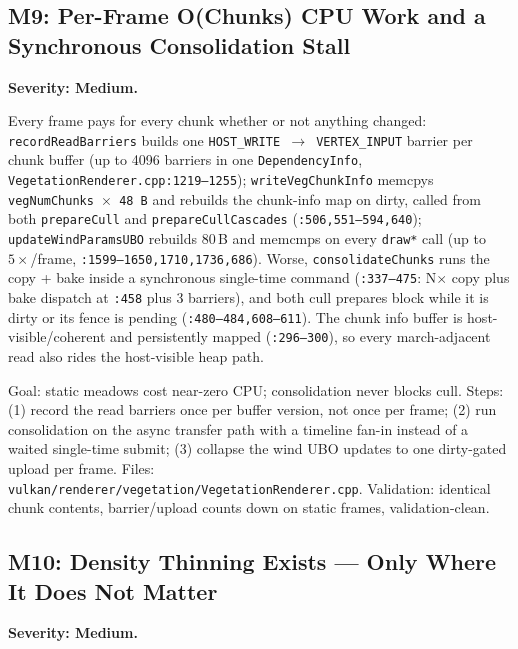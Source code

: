 \documentclass[11pt,a4paper]{article}
\begin{document}
\subsection{M9: Per-Frame O(Chunks) CPU Work and a Synchronous Consolidation Stall}

\textbf{Severity: Medium.}

Every frame pays for every chunk whether or not anything changed:
\texttt{recordReadBarriers} builds one \texttt{HOST\_WRITE
$\rightarrow$ VERTEX\_INPUT} barrier per chunk buffer (up to 4096 barriers
in one \texttt{DependencyInfo},
\texttt{VegetationRenderer.cpp:1219--1255});
\texttt{writeVegChunkInfo} memcpys \texttt{vegNumChunks $\times$ 48\,B} and
rebuilds the chunk-info map on dirty, called from both \texttt{prepareCull}
and \texttt{prepareCullCascades} (\texttt{:506,551--594,640});
\texttt{updateWindParamsUBO} rebuilds 80\,B and memcmps on every
\texttt{draw*} call (up to $5\times$/frame,
\texttt{:1599--1650,1710,1736,686}). Worse, \texttt{consolidateChunks} runs
the copy + bake inside a synchronous single-time command
(\texttt{:337--475}: N$\times$ copy plus bake dispatch at \texttt{:458}
plus 3 barriers), and both cull prepares block while it is dirty or its
fence is pending (\texttt{:480--484,608--611}). The chunk info buffer is
host-visible/coherent and persistently mapped (\texttt{:296--300}), so every
march-adjacent read also rides the host-visible heap path.

\begin{tcolorbox}[promptbox={Prompt --- M9: dirty-gated barriers, async consolidation}]
Goal: static meadows cost near-zero CPU; consolidation never blocks cull.
Steps: (1) record the read barriers once per buffer version, not once per
frame; (2) run consolidation on the async transfer path with a timeline
fan-in instead of a waited single-time submit; (3) collapse the wind UBO
updates to one dirty-gated upload per frame. Files:
\texttt{vulkan/renderer/vegetation/VegetationRenderer.cpp}. Validation:
identical chunk contents, barrier/upload counts down on static frames,
validation-clean.
\end{tcolorbox}

\subsection{M10: Density Thinning Exists --- Only Where It Does Not Matter}

\textbf{Severity: Medium.}
\end{document}
